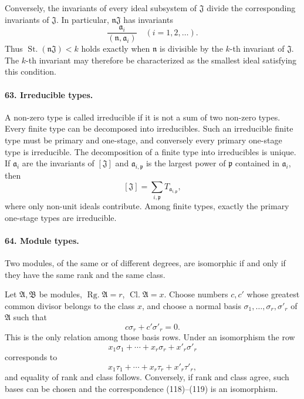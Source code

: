 \documentclass[11pt]{article}
\newcommand{\Rg}{\operatorname{Rg.}}
\newcommand{\Kl}{\operatorname{Cl.}}
\newcommand{\St}{\operatorname{St.}}
\begin{document}
Conversely, the invariants of every ideal subsystem of $\mathfrak J$ divide the corresponding invariants of $\mathfrak J$. In particular, $\mathfrak n\mathfrak J$ has invariants
\begin{equation}
  \frac{\mathfrak a_i}{(\mathfrak n,\mathfrak a_i)}\quad (i=1,2,
\ldots).
\tag{117}
\end{equation}
Thus $\St(\mathfrak n\mathfrak J)<k$ holds exactly when $\mathfrak n$ is divisible by the $k$-th invariant of $\mathfrak J$. The $k$-th invariant may therefore be characterized as the smallest ideal satisfying this condition.

\paragraph{63. Irreducible types.}
A non-zero type is called irreducible if it is not a sum of two non-zero types. Every finite type can be decomposed into irreducibles. Such an irreducible finite type must be primary and one-stage, and conversely every primary one-stage type is irreducible. The decomposition of a finite type into irreducibles is unique. If $\mathfrak a_i$ are the invariants of $[\mathfrak J]$ and $\mathfrak a_{i,\mathfrak p}$ is the largest power of $\mathfrak p$ contained in $\mathfrak a_i$, then
\[
  [\mathfrak J]=\sum_{i,\mathfrak p}T_{\mathfrak a_{i,\mathfrak p}},
\]
where only non-unit ideals contribute. Among finite types, exactly the primary one-stage types are irreducible.

\paragraph{64. Module types.}
Two modules, of the same or of different degrees, are isomorphic if and only if they have the same rank and the same class.

Let $\mathfrak A,\mathfrak B$ be modules, $\Rg\mathfrak A=r$, $\Kl\mathfrak A=x$. Choose numbers $c,c'$ whose greatest common divisor belongs to the class $x$, and choose a normal basis $\sigma_1,
\ldots,
\sigma_r,
\sigma'_r$ of $\mathfrak A$ such that
\[
  c\sigma_r+c'\sigma'_r=0.
\]
This is the only relation among those basis rows. Under an isomorphism the row
\begin{equation}
  x_1\sigma_1+\cdots+x_r\sigma_r+x'_r\sigma'_r
\tag{118}
\end{equation}
corresponds to
\begin{equation}
  x_1\tau_1+\cdots+x_r\tau_r+x'_r\tau'_r,
\tag{119}
\end{equation}
and equality of rank and class follows. Conversely, if rank and class agree, such bases can be chosen and the correspondence (118)--(119) is an isomorphism.
\end{document}
